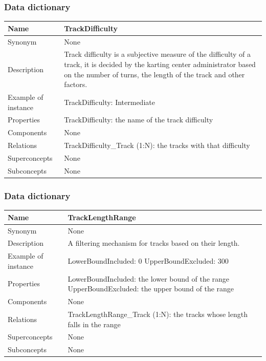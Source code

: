 \documentclass{beamer}
\begin{document}
\begin{frame}
    \frametitle{Data dictionary}
    \begin{table}
    \tiny
    \begin{tabular}{|p{2cm}|p{6cm}|}
    \hline
    Name & \textbf{TrackDifficulty} \\
    \hline
    Synonym & None \\
    \hline
    Description & Track difficulty is a subjective measure of the difficulty of a track,
    it is decided by the karting center administrator based on the number of turns,
    the length of the track and other factors. \\
    \hline
    Example of instance &
    TrackDifficulty: Intermediate \\
    \hline
    Properties &
    TrackDifficulty: the name of the track difficulty \\
    \hline
    Components & None \\
    \hline
    Relations &
    TrackDifficulty\_Track (1:N): the tracks with that difficulty \\
    \hline
    Superconcepts & None \\
    \hline
    Subconcepts & None \\
    \hline
    \end{tabular}
    \end{table}
\end{frame}


\begin{frame}
    \frametitle{Data dictionary}
    \begin{table}
    \tiny
    \begin{tabular}{|p{2cm}|p{6cm}|}
    \hline
    Name & \textbf{TrackLengthRange} \\
    \hline
    Synonym & None \\
    \hline
    Description & A filtering mechanism for tracks based on their length. \\
    \hline
    Example of instance &
    LowerBoundIncluded: 0 \newline
    UpperBoundExcluded: 300 \\
    \hline
    Properties &
    LowerBoundIncluded: the lower bound of the range \newline
    UpperBoundExcluded: the upper bound of the range \\
    \hline
    Components & None \\
    \hline
    Relations &
    TrackLengthRange\_Track (1:N): the tracks whose length falls in the range \\
    \hline
    Superconcepts & None \\
    \hline
    Subconcepts & None \\
    \hline
    \end{tabular}
    \end{table}
\end{frame}
\end{document}
